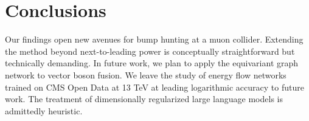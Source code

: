 \section{Conclusions}\label{sec:conclusions}

Our findings open new avenues for bump hunting at a muon collider.
Extending the method beyond next-to-leading power is conceptually
straightforward but technically demanding. In future work, we plan to
apply the equivariant graph network to vector boson fusion. We leave the
study of energy flow networks trained on CMS Open Data at 13 TeV at
leading logarithmic accuracy to future work. The treatment of
dimensionally regularized large language models is admittedly heuristic.

